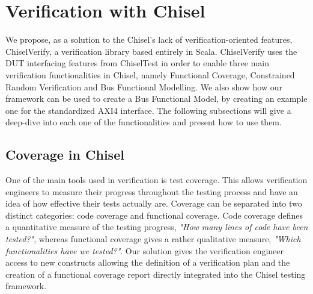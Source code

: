 \documentclass[conference]{IEEEtran}
\newcommand{\todo}[1]{{\color{olive} TODO: #1}}
\newcommand{\martin}[1]{{\color{blue} Martin: #1}}
\begin{document}
\section{Verification with Chisel}

We propose, as a solution to the Chisel's lack of verification-oriented features, ChiselVerify, a verification library based entirely in Scala. ChiselVerify uses the DUT interfacing features from ChiselTest in order to enable three main verification functionalities in Chisel, namely Functional Coverage, Constrained Random Verification and Bus Functional Modelling. We also show how our framework can be used to create a Bus Functional Model, by creating an example one for the standardized AXI4 interface. The following subsections will give a deep-dive into each one of the functionalities and present how to use them.

\subsection{Coverage in Chisel}


One of the main tools used in verification is test coverage. This allows verification engineers to measure their progress throughout the testing process and have an idea of how effective their tests actually are. Coverage can be separated into two distinct categories: code coverage and functional coverage. Code coverage defines a quantitative measure of the testing progress, \textit{"How many lines of code have been tested?"}, whereas functional coverage gives a rather qualitative measure, \textit{"Which functionalities have we tested?"}.  Our solution gives the verification engineer access to new constructs allowing the definition of a verification plan and the creation of a functional coverage report directly integrated into the Chisel testing framework.
\end{document}

